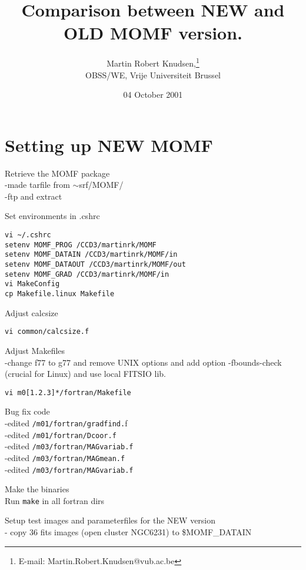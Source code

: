 \documentclass[11pt,a4paper,twoside]{article}
\begin{document}
\title{Comparison between NEW and OLD MOMF version.}
\author{Martin Robert Knudsen,\thanks{E-mail: Martin.Robert.Knudsen@vub.ac.be}\\
OBSS/WE, Vrije Universiteit Brussel}
\date{04 October 2001}
\maketitle
\section{Setting up NEW MOMF}
\bi
\item{Retrieve the MOMF package}\\
-made tarfile from $\sim$srf/MOMF/ \\
-ftp and extract
\item{Set environments in .cshrc}
\begin{verbatim}vi ~/.cshrc
setenv MOMF_PROG /CCD3/martinrk/MOMF
setenv MOMF_DATAIN /CCD3/martinrk/MOMF/in
setenv MOMF_DATAOUT /CCD3/martinrk/MOMF/out
setenv MOMF_GRAD /CCD3/martinrk/MOMF/in
vi MakeConfig
cp Makefile.linux Makefile
\end{verbatim}
\item{Adjust calcsize}
\begin{verbatim}vi common/calcsize.f\end{verbatim}
\item{Adjust Makefiles}\\
-change f77 to g77 and remove UNIX options and 
 add option -fbounds-check (crucial for Linux) and
 use local FITSIO lib.
\begin{verbatim}vi m0[1.2.3]*/fortran/Makefile\end{verbatim}
\item{Bug fix code}\\
-edited \texttt{/m01/fortran/gradfind.}f\\
-edited \texttt{/m01/fortran/Dcoor.f}\\
-edited \texttt{/m03/fortran/MAGvariab.f}\\
-edited \texttt{/m03/fortran/MAGmean.f}\\
-edited \texttt{/m03/fortran/MAGvariab.f}
\item{Make the binaries}\\
Run \texttt{make} in all fortran dirs
\item{Setup test images and parameterfiles for the NEW version}\\
- copy 36 fits images (open cluster NGC6231) to {\$}MOMF{\_}DATAIN\\
\end{document}
